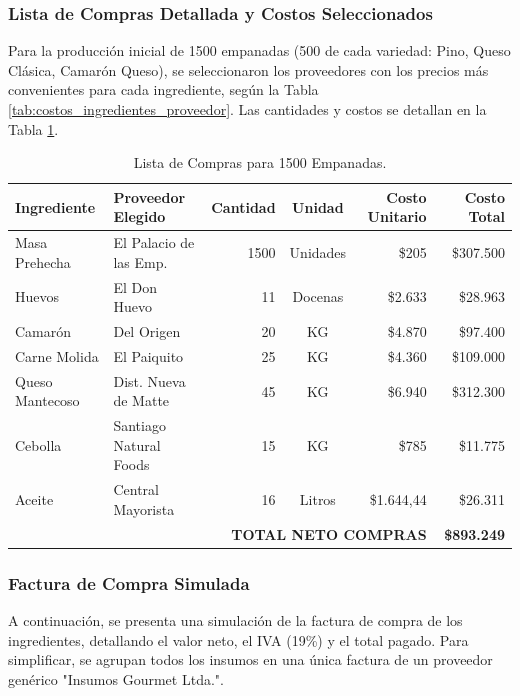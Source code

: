 \documentclass[12pt]{article}
\begin{document}
        \subsubsection{Lista de Compras Detallada y Costos Seleccionados}
        Para la producción inicial de 1500 empanadas (500 de cada variedad: Pino, Queso Clásica, Camarón Queso), se seleccionaron los proveedores con los precios más convenientes para cada ingrediente, según la Tabla \ref{tab:costos_ingredientes_proveedor}. Las cantidades y costos se detallan en la Tabla \ref{tab:lista_compras}.

        \begin{table}[H]
            \centering
            \small %
            \begin{tabular}{|l|l|r|c|r|r|}
                \hline
                \textbf{Ingrediente} & \textbf{Proveedor Elegido} & \textbf{Cantidad} & \textbf{Unidad} & \textbf{Costo Unitario} & \textbf{Costo Total} \\
                \hline
                Masa Prehecha & El Palacio de las Emp. & 1500 & Unidades & \$205 & \$307.500 \\
                Huevos & El Don Huevo & 11 & Docenas & \$2.633 & \$28.963 \\
                Camarón & Del Origen & 20 & KG & \$4.870 & \$97.400 \\
                Carne Molida & El Paiquito & 25 & KG & \$4.360 & \$109.000 \\
                Queso Mantecoso & Dist. Nueva de Matte & 45 & KG & \$6.940 & \$312.300 \\
                Cebolla & Santiago Natural Foods & 15 & KG & \$785 & \$11.775 \\
                Aceite & Central Mayorista & 16 & Litros & \$1.644,44 & \$26.311 \\
                \hline
                \multicolumn{5}{|r|}{\textbf{TOTAL NETO COMPRAS}} & \textbf{\$893.249} \\
                \hline
            \end{tabular}
            \caption{Lista de Compras para 1500 Empanadas.}
            \label{tab:lista_compras}
        \end{table}

        \subsubsection{Factura de Compra Simulada}
        A continuación, se presenta una simulación de la factura de compra de los ingredientes, detallando el valor neto, el IVA (19\%) y el total pagado. Para simplificar, se agrupan todos los insumos en una única factura de un proveedor genérico "Insumos Gourmet Ltda.".
\end{document}
